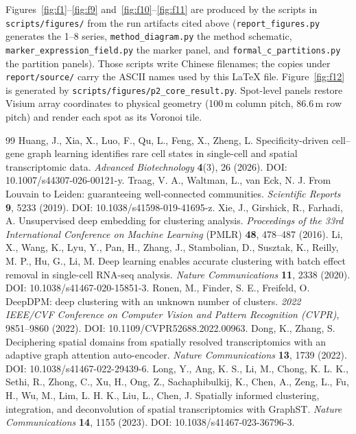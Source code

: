 \documentclass[twocolumn,10pt]{article}
\begin{document}
Figures~\ref{fig:f1}--\ref{fig:f9} and~\ref{fig:f10}--\ref{fig:f11} are produced by the scripts in \texttt{scripts/figures/} from the run artifacts cited above (\texttt{report\_figures.py} generates the 1--8 series, \texttt{method\_diagram.py} the method schematic, \texttt{marker\_expression\_field.py} the marker panel, and \texttt{formal\_c\_partitions.py} the partition panels). Those scripts write Chinese filenames; the copies under \texttt{report/source/} carry the ASCII names used by this \LaTeX{} file. Figure~\ref{fig:f12} is generated by \texttt{scripts/figures/p2\_core\_result.py}. Spot-level panels restore Visium array coordinates to physical geometry (100\,\textmu m column pitch, 86.6\,\textmu m row pitch) and render each spot as its Voronoi tile.

\begin{thebibliography}{99}
 Huang, J., Xia, X., Luo, F., Qu, L., Feng, X., Zheng, L. Specificity-driven cell--gene graph learning identifies rare cell states in single-cell and spatial transcriptomic data. \emph{Advanced Biotechnology} \textbf{4}(3), 26 (2026). DOI: 10.1007/s44307-026-00121-y.
 Traag, V. A., Waltman, L., van Eck, N. J. From Louvain to Leiden: guaranteeing well-connected communities. \emph{Scientific Reports} \textbf{9}, 5233 (2019). DOI: 10.1038/s41598-019-41695-z.
 Xie, J., Girshick, R., Farhadi, A. Unsupervised deep embedding for clustering analysis. \emph{Proceedings of the 33rd International Conference on Machine Learning} (PMLR) \textbf{48}, 478--487 (2016).
 Li, X., Wang, K., Lyu, Y., Pan, H., Zhang, J., Stambolian, D., Susztak, K., Reilly, M. P., Hu, G., Li, M. Deep learning enables accurate clustering with batch effect removal in single-cell RNA-seq analysis. \emph{Nature Communications} \textbf{11}, 2338 (2020). DOI: 10.1038/s41467-020-15851-3.
 Ronen, M., Finder, S. E., Freifeld, O. DeepDPM: deep clustering with an unknown number of clusters. \emph{2022 IEEE/CVF Conference on Computer Vision and Pattern Recognition (CVPR)}, 9851--9860 (2022). DOI: 10.1109/CVPR52688.2022.00963.
 Dong, K., Zhang, S. Deciphering spatial domains from spatially resolved transcriptomics with an adaptive graph attention auto-encoder. \emph{Nature Communications} \textbf{13}, 1739 (2022). DOI: 10.1038/s41467-022-29439-6.
 Long, Y., Ang, K. S., Li, M., Chong, K. L. K., Sethi, R., Zhong, C., Xu, H., Ong, Z., Sachaphibulkij, K., Chen, A., Zeng, L., Fu, H., Wu, M., Lim, L. H. K., Liu, L., Chen, J. Spatially informed clustering, integration, and deconvolution of spatial transcriptomics with GraphST. \emph{Nature Communications} \textbf{14}, 1155 (2023). DOI: 10.1038/s41467-023-36796-3.

\end{thebibliography}
\end{document}
